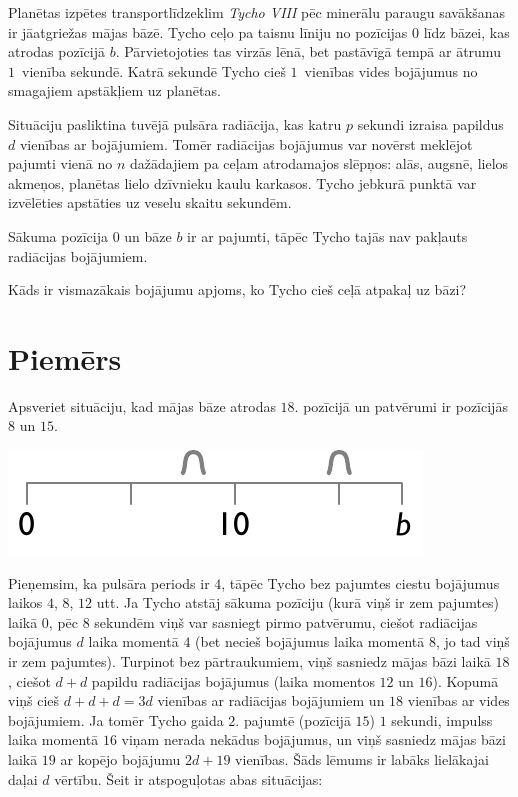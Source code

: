 

\noindent
Planētas izpētes transportlīdzeklim \emph{Tycho VIII} pēc minerālu paraugu savākšanas ir jāatgriežas mājas bāzē.
Tycho ceļo pa taisnu līniju no pozīcijas $0$ līdz bāzei, kas atrodas pozīcijā $b$.
Pārvietojoties tas virzās lēnā, bet pastāvīgā tempā ar ātrumu $1$~vienība sekundē.
Katrā sekundē Tycho cieš $1$~vienības vides bojājumus no smagajiem apstākļiem uz planētas.

Situāciju pasliktina tuvējā pulsāra radiācija, kas katru $p$ sekundi izraisa papildus $d$ vienības ar bojājumiem.
Tomēr radiācijas bojājumus var novērst meklējot pajumti vienā no $n$ dažādajiem pa ceļam atrodamajos slēpņos: alās, augsnē, lielos akmeņos, planētas lielo dzīvnieku kaulu karkasos.
Tycho jebkurā punktā var izvēlēties apstāties uz veselu skaitu sekundēm.

Sākuma pozīcija $0$ un bāze $b$ ir ar pajumti, tāpēc Tycho tajās nav pakļauts radiācijas bojājumiem.

\medskip
Kāds ir vismazākais bojājumu apjoms, ko Tycho cieš ceļā atpakaļ uz bāzi?

\section*{Piemērs}

Apsveriet situāciju, kad mājas bāze atrodas $18$. pozīcijā un patvērumi ir pozīcijās $8$ un $15$.

\includegraphics[width=.3\textwidth]{img/samplesetup}

Pieņemsim, ka pulsāra periods ir $4$, tāpēc Tycho bez pajumtes ciestu bojājumus laikos $4$, $8$, $12$ utt.
Ja Tycho atstāj sākuma pozīciju (kurā viņš ir zem pajumtes) laikā $0$, pēc $8$ sekundēm viņš var sasniegt pirmo patvērumu, ciešot radiācijas bojājumus $d$ laika momentā $4$ (bet necieš bojājumus laika momentā $8$, jo tad viņš ir zem pajumtes).
Turpinot bez pārtraukumiem, viņš sasniedz mājas bāzi laikā $18$, ciešot $d+d$ papildu radiācijas bojājumus (laika momentos $12$ un $16$).
Kopumā viņš cieš $d+d+d=3d$ vienības ar radiācijas bojājumiem un $18$ vienības ar vides bojājumiem.
Ja tomēr Tycho gaida $2.$ pajumtē (pozīcijā $15$) $1$ sekundi, impulss laika momentā $16$ viņam nerada nekādus bojājumus, un viņš sasniedz mājas bāzi laikā $19$ ar kopējo bojājumu $2d + 19$ vienības.
Šāds lēmums ir labāks lielākajai daļai $d$ vērtību.
Šeit ir atspoguļotas abas situācijas:

